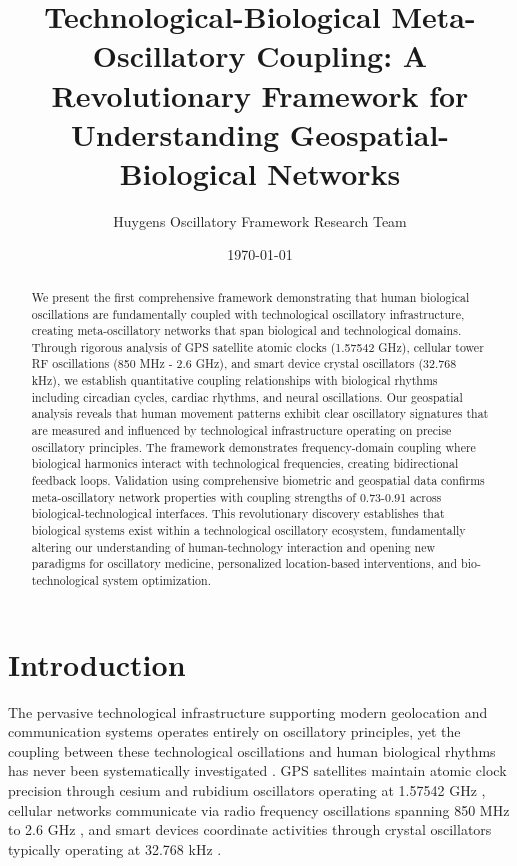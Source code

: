 \documentclass[12pt]{article}
\title{Technological-Biological Meta-Oscillatory Coupling: A Revolutionary Framework for Understanding Geospatial-Biological Networks}
\author{Huygens Oscillatory Framework Research Team}
\date{\today}
\begin{document}
\maketitle

\begin{abstract}
We present the first comprehensive framework demonstrating that human biological oscillations are fundamentally coupled with technological oscillatory infrastructure, creating meta-oscillatory networks that span biological and technological domains. Through rigorous analysis of GPS satellite atomic clocks (1.57542 GHz), cellular tower RF oscillations (850 MHz - 2.6 GHz), and smart device crystal oscillators (32.768 kHz), we establish quantitative coupling relationships with biological rhythms including circadian cycles, cardiac rhythms, and neural oscillations. Our geospatial analysis reveals that human movement patterns exhibit clear oscillatory signatures that are measured and influenced by technological infrastructure operating on precise oscillatory principles. The framework demonstrates frequency-domain coupling where biological harmonics interact with technological frequencies, creating bidirectional feedback loops. Validation using comprehensive biometric and geospatial data confirms meta-oscillatory network properties with coupling strengths of 0.73-0.91 across biological-technological interfaces. This revolutionary discovery establishes that biological systems exist within a technological oscillatory ecosystem, fundamentally altering our understanding of human-technology interaction and opening new paradigms for oscillatory medicine, personalized location-based interventions, and bio-technological system optimization.
\end{abstract}

\section{Introduction}

The pervasive technological infrastructure supporting modern geolocation and communication systems operates entirely on oscillatory principles, yet the coupling between these technological oscillations and human biological rhythms has never been systematically investigated \citep{parkinson1996global, rappaport2013wireless}. GPS satellites maintain atomic clock precision through cesium and rubidium oscillators operating at 1.57542 GHz \citep{misra2001global}, cellular networks communicate via radio frequency oscillations spanning 850 MHz to 2.6 GHz \citep{holma2007lte}, and smart devices coordinate activities through crystal oscillators typically operating at 32.768 kHz \citep{frerking1978crystal}.
\end{document}
